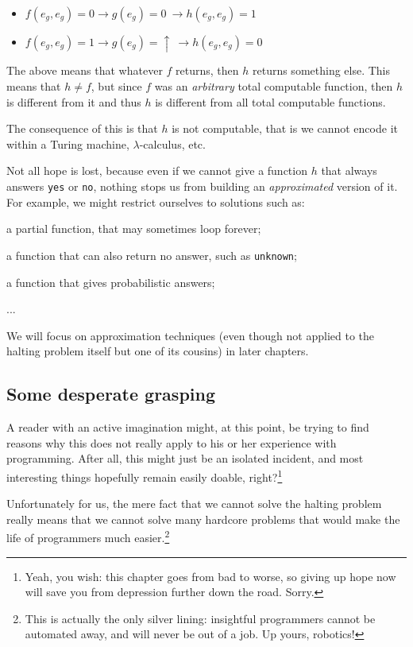 \begin{itemize}
\item $f(e_g,e_g)=0 \rightarrow g(e_g)=0 \ \rightarrow h(e_g,e_g)=1$
\item $f(e_g,e_g)=1 \rightarrow g(e_g)=\uparrow \ \rightarrow h(e_g,e_g)=0$
\end{itemize}

The above means that whatever $f$ returns, then $h$ returns something else. This means that $h \neq f$, but since $f$ was an \textit{arbitrary} total computable function, then $h$ is different from it and thus $h$ is different from all total computable functions.

The consequence of this is that $h$ is not computable, that is we cannot encode it within a Turing machine, $\lambda$-calculus, etc.

Not all hope is lost, because even if we cannot give a function $h$ that always answers \texttt{yes} or \texttt{no}, nothing stops us from  building an \textit{approximated} version of it. For example, we might restrict ourselves to solutions such as:
\begin{inparaenum}
\item a partial function, that may sometimes loop forever;
\item a function that can also return no answer, such as \texttt{unknown};
\item a function that gives probabilistic answers;
\item ...
\end{inparaenum}

We will focus on approximation techniques (even though not applied to the halting problem itself but one of its cousins) in later chapters.


\subsection{Some desperate grasping}
A reader with an active imagination might, at this point, be trying to find reasons why this does not really apply to his or her experience with programming. After all, this might just be an isolated incident, and most interesting things hopefully remain easily doable, right?\footnote{Yeah, you wish: this chapter goes from bad to worse, so giving up hope now will save you from depression further down the road. Sorry.}

Unfortunately for us, the mere fact that we cannot solve the halting problem really means that we cannot solve many hardcore problems that would make the life of programmers much easier.\footnote{This is actually the only silver lining: insightful programmers cannot be automated away, and will never be out of a job. Up yours, robotics!}

